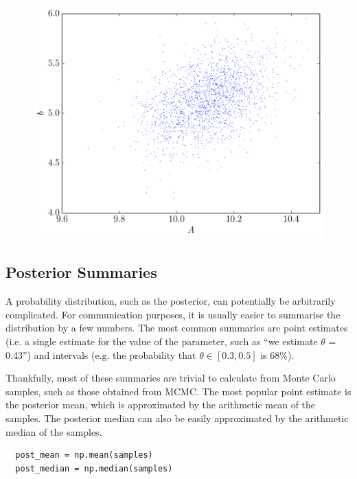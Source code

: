 \begin{figure}
\begin{center}
\includegraphics[scale=0.5]{joint_posterior.pdf}
\caption{\label{fig:joint_posterior}}
\end{center}
\end{figure}


\subsection{Posterior Summaries}
A probability distribution, such as the posterior,
can potentially be arbitrarily complicated. For communication purposes, it is
usually easier to summarise the distribution by a few numbers. The most common
summaries are point estimates (i.e. a single estimate for the value of the
parameter, such as ``we estimate $\theta$ = 0.43'') and intervals (e.g.
the probability that $\theta \in [0.3, 0.5]$ is 68\%).

Thankfully, most of these summaries are trivial to calculate from Monte Carlo
samples, such as those obtained from MCMC. The most popular point estimate is
the posterior mean, which is approximated by the arithmetic mean of the samples.
The posterior median can also be easily approximated by the arithmetic median
of the samples.

\begin{verbatim}
  post_mean = np.mean(samples)
  post_median = np.median(samples)
\end{verbatim}

